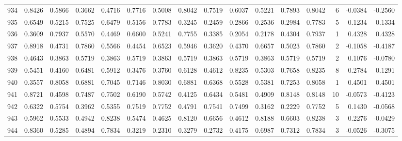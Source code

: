 \begin{tabular}{lrrrrrrrrrrrrrrr}
934 &      0.8426 &  0.5866 &  0.3662 &  0.4716 &  0.7716 &  0.5008 &  0.8042 &  0.7519 &  0.6037 &  0.5221 &   0.7893 &     0.8042 &      6 &                   -0.0384 &                    -0.2560 \\
935 &      0.6549 &  0.5215 &  0.7525 &  0.6479 &  0.5156 &  0.7783 &  0.3245 &  0.2459 &  0.2866 &  0.2536 &   0.2984 &     0.7783 &      5 &                    0.1234 &                    -0.1334 \\
936 &      0.3609 &  0.7937 &  0.5570 &  0.4469 &  0.6600 &  0.5241 &  0.7755 &  0.3385 &  0.2054 &  0.2178 &   0.4304 &     0.7937 &      1 &                    0.4328 &                     0.4328 \\
937 &      0.8918 &  0.4731 &  0.7860 &  0.5566 &  0.4454 &  0.6523 &  0.5946 &  0.3620 &  0.4370 &  0.6657 &   0.5023 &     0.7860 &      2 &                   -0.1058 &                    -0.4187 \\
938 &      0.4643 &  0.3863 &  0.5719 &  0.3863 &  0.5719 &  0.3863 &  0.5719 &  0.3863 &  0.5719 &  0.3863 &   0.5719 &     0.5719 &      2 &                    0.1076 &                    -0.0780 \\
939 &      0.5451 &  0.4160 &  0.6481 &  0.5912 &  0.3476 &  0.3760 &  0.6128 &  0.4612 &  0.8235 &  0.5303 &   0.7658 &     0.8235 &      8 &                    0.2784 &                    -0.1291 \\
940 &      0.3557 &  0.8058 &  0.6881 &  0.7045 &  0.7146 &  0.8030 &  0.6881 &  0.6368 &  0.5528 &  0.5381 &   0.7253 &     0.8058 &      1 &                    0.4501 &                     0.4501 \\
941 &      0.8721 &  0.4598 &  0.7487 &  0.7502 &  0.6190 &  0.5742 &  0.4125 &  0.6434 &  0.5481 &  0.4909 &   0.8148 &     0.8148 &     10 &                   -0.0573 &                    -0.4123 \\
942 &      0.6322 &  0.5754 &  0.3962 &  0.5355 &  0.7519 &  0.7752 &  0.4791 &  0.7541 &  0.7499 &  0.3162 &   0.2229 &     0.7752 &      5 &                    0.1430 &                    -0.0568 \\
943 &      0.5962 &  0.5533 &  0.4942 &  0.8238 &  0.5474 &  0.4625 &  0.8120 &  0.6656 &  0.4612 &  0.8188 &   0.6603 &     0.8238 &      3 &                    0.2276 &                    -0.0429 \\
944 &      0.8360 &  0.5285 &  0.4894 &  0.7834 &  0.3219 &  0.2310 &  0.3279 &  0.2732 &  0.4175 &  0.6987 &   0.7312 &     0.7834 &      3 &                   -0.0526 &                    -0.3075 \\

\end{tabular}
